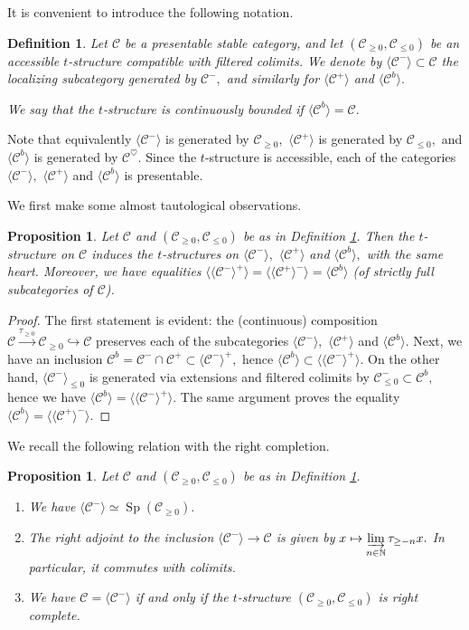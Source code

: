 \documentclass[11pt,leqno]{amsart}
\newtheorem{defi}[theo]{Definition}
\newtheorem{prop}[theo]{Proposition}
\numberwithin{equation}{section}
\def\N{\mathbb{N}}
\newcommand{\indlim}[1][]{\mathop{\varinjlim}\limits_{#1}}
\newcommand{\xto}{\xrightarrow}
\newcommand{\hto}{\hookrightarrow}
\newcommand{\cC}{{\mathcal C}}
\newcommand{\la}{\langle}
\newcommand{\ra}{\rangle}
\newcommand{\Sp}{\operatorname{Sp}}
\begin{document}
It is convenient to introduce the following notation.

\begin{defi}\label{def:C^-_C^+_C^b}
Let $\cC$ be a presentable stable category, and let $(\cC_{\geq 0},\cC_{\leq 0})$ be an accessible $t$-structure compatible with filtered colimits. We denote by $\la \cC^-\ra\subset\cC$ the localizing subcategory generated by $\cC^-,$ and similarly for $\la \cC^+\ra$ and $\la \cC^b\ra.$

We say that the $t$-structure is continuously bounded if $\la\cC^b\ra=\cC.$
\end{defi}

Note that equivalently $\la \cC^-\ra$ is generated by $\cC_{\geq 0},$ $\la \cC^+\ra$ is generated by $\cC_{\leq 0},$ and $\la \cC^b\ra$ is generated by $\cC^{\heartsuit}.$ Since the $t$-structure is accessible, each of the categories $\la \cC^-\ra,$ $\la \cC^+\ra$ and $\la \cC^b\ra$ is presentable.

We first make some almost tautological observations.

\begin{prop}\label{prop:C^-_C^+_C^b_t_structures}
Let $\cC$ and $(\cC_{\geq 0},\cC_{\leq 0})$ be as in Definition \ref{def:C^-_C^+_C^b}. Then the $t$-structure on $\cC$ induces the $t$-structures on $\la\cC^-\ra,$ $\la\cC^+\ra$ and $\la\cC^b\ra,$ with the same heart. Moreover, we have equalities $\la\la \cC^-\ra^+\ra = \la\la \cC^+\ra^-\ra=\la\cC^b\ra$ (of strictly full subcategories of $\cC$). 
\end{prop}

\begin{proof}
The first statement is evident: the (continuous) composition $\cC\xto{\tau_{\geq 0}}\cC_{\geq 0}\hto\cC$ preserves each of the subcategories $\la\cC^-\ra,$ $\la\cC^+\ra$ and $\la\cC^b\ra.$ Next, we have an inclusion $\cC^b=\cC^-\cap\cC^+\subset \la \cC^-\ra^+,$ hence $\la\cC^b\ra\subset \la\la \cC^-\ra^+\ra.$ On the other hand, $\la \cC^-\ra_{\leq 0}$ is generated via extensions and filtered colimits by $\cC^-_{\leq 0}\subset\cC^b,$ hence we have $\la\cC^b\ra = \la\la \cC^-\ra^+\ra.$ The same argument proves the equality $\la\cC^b\ra = \la\la \cC^+\ra^-\ra.$
\end{proof}

We recall the following relation with the right completion.

\begin{prop}\label{prop:C^-_and_right_completion}
Let $\cC$ and $(\cC_{\geq 0},\cC_{\leq 0})$ be as in Definition \ref{def:C^-_C^+_C^b}.
\begin{enumerate}[label=(\roman*),ref=(\roman*)]
	\item We have $\la\cC^-\ra\simeq\Sp(\cC_{\geq 0}).$
	\item The right adjoint to the inclusion $\la\cC^-\ra\to\cC$ is given by $x\mapsto\indlim[n\in\N]\tau_{\geq -n}x.$ In particular, it commutes with colimits.
	\item We have $\cC=\la\cC^-\ra$ if and only if the $t$-structure $(\cC_{\geq 0},\cC_{\leq 0})$ is right complete.
\end{enumerate}
\end{prop}
\end{document}
